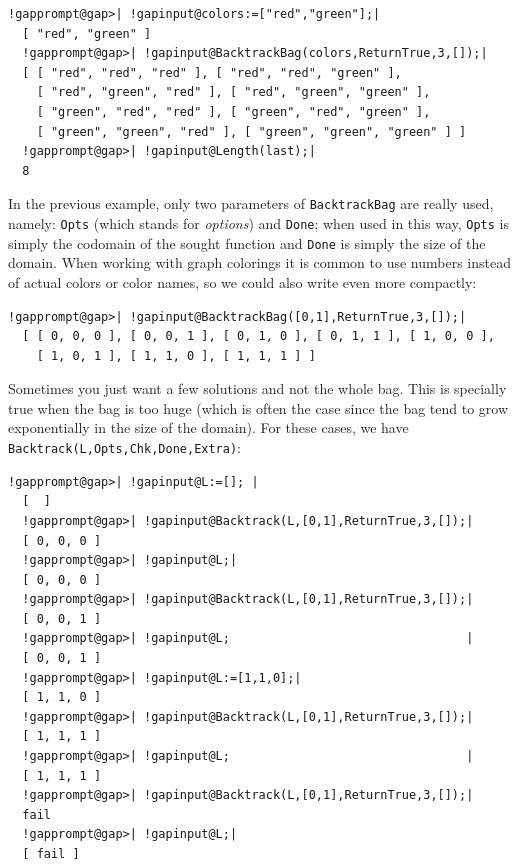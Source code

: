 \documentclass[a4paper,11pt]{report}
\begin{document}
{{ 
\begin{Verbatim}[commandchars=!@|,fontsize=\small,frame=single,label=Example]
  !gapprompt@gap>| !gapinput@colors:=["red","green"];|
  [ "red", "green" ]
  !gapprompt@gap>| !gapinput@BacktrackBag(colors,ReturnTrue,3,[]);|
  [ [ "red", "red", "red" ], [ "red", "red", "green" ], 
    [ "red", "green", "red" ], [ "red", "green", "green" ], 
    [ "green", "red", "red" ], [ "green", "red", "green" ], 
    [ "green", "green", "red" ], [ "green", "green", "green" ] ]
  !gapprompt@gap>| !gapinput@Length(last);|
  8
\end{Verbatim}
 

In the previous example, only two parameters of \texttt{BacktrackBag} are really used, namely: \texttt{Opts} (which stands for \emph{options}) and \texttt{Done}; when used in this way, \texttt{Opts} is simply the codomain of the sought function and \texttt{Done} is simply the size of the domain. When working with graph colorings it is
common to use numbers instead of actual colors or color names, so we could
also write even more compactly: 

 
\begin{Verbatim}[commandchars=!@|,fontsize=\small,frame=single,label=Example]
  !gapprompt@gap>| !gapinput@BacktrackBag([0,1],ReturnTrue,3,[]);|
  [ [ 0, 0, 0 ], [ 0, 0, 1 ], [ 0, 1, 0 ], [ 0, 1, 1 ], [ 1, 0, 0 ], 
    [ 1, 0, 1 ], [ 1, 1, 0 ], [ 1, 1, 1 ] ]
\end{Verbatim}
 

Sometimes you just want a few solutions and not the whole bag. This is
specially true when the bag is too huge (which is often the case since the bag
tend to grow exponentially in the size of the domain). For these cases, we
have \texttt{Backtrack(L,Opts,Chk,Done,Extra)}: 

 
\begin{Verbatim}[commandchars=!@|,fontsize=\small,frame=single,label=Example]
  !gapprompt@gap>| !gapinput@L:=[]; |
  [  ]
  !gapprompt@gap>| !gapinput@Backtrack(L,[0,1],ReturnTrue,3,[]);|
  [ 0, 0, 0 ]
  !gapprompt@gap>| !gapinput@L;|
  [ 0, 0, 0 ]
  !gapprompt@gap>| !gapinput@Backtrack(L,[0,1],ReturnTrue,3,[]);|
  [ 0, 0, 1 ]
  !gapprompt@gap>| !gapinput@L;                                 |
  [ 0, 0, 1 ]
  !gapprompt@gap>| !gapinput@L:=[1,1,0];|
  [ 1, 1, 0 ]
  !gapprompt@gap>| !gapinput@Backtrack(L,[0,1],ReturnTrue,3,[]);|
  [ 1, 1, 1 ]
  !gapprompt@gap>| !gapinput@L;                                 |
  [ 1, 1, 1 ]
  !gapprompt@gap>| !gapinput@Backtrack(L,[0,1],ReturnTrue,3,[]);|
  fail
  !gapprompt@gap>| !gapinput@L;|
  [ fail ]
\end{Verbatim}
 

}}
\end{document}
